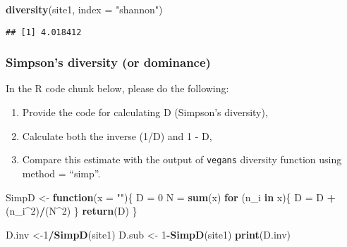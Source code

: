 \documentclass[
]{article}
\newenvironment{Shaded}{\begin{snugshade}}{\end{snugshade}}
\newcommand{\AttributeTok}[1]{\textcolor[rgb]{0.13,0.29,0.53}{#1}}
\newcommand{\ControlFlowTok}[1]{\textcolor[rgb]{0.13,0.29,0.53}{\textbf{#1}}}
\newcommand{\DecValTok}[1]{\textcolor[rgb]{0.00,0.00,0.81}{#1}}
\newcommand{\FunctionTok}[1]{\textcolor[rgb]{0.13,0.29,0.53}{\textbf{#1}}}
\newcommand{\NormalTok}[1]{#1}
\newcommand{\OtherTok}[1]{\textcolor[rgb]{0.56,0.35,0.01}{#1}}
\newcommand{\SpecialCharTok}[1]{\textcolor[rgb]{0.81,0.36,0.00}{\textbf{#1}}}
\newcommand{\StringTok}[1]{\textcolor[rgb]{0.31,0.60,0.02}{#1}}
\begin{document}
\begin{Shaded}
\begin{Highlighting}[]
\FunctionTok{diversity}\NormalTok{(site1, }\AttributeTok{index =} \StringTok{"shannon"}\NormalTok{)}
\end{Highlighting}
\end{Shaded}

\begin{verbatim}
## [1] 4.018412
\end{verbatim}

\subsubsection{Simpson's diversity (or
dominance)}\label{simpsons-diversity-or-dominance}

In the R code chunk below, please do the following:

\begin{enumerate}
\def\labelenumi{\arabic{enumi}.}
\item
  Provide the code for calculating D (Simpson's diversity),
\item
  Calculate both the inverse (1/D) and 1 - D,
\item
  Compare this estimate with the output of
  \texttt{vegan\textquotesingle{}s} diversity function using method =
  ``simp''.
\end{enumerate}

\begin{Shaded}
\begin{Highlighting}[]
\NormalTok{SimpD }\OtherTok{\textless{}{-}} \ControlFlowTok{function}\NormalTok{(}\AttributeTok{x =} \StringTok{""}\NormalTok{)\{}
\NormalTok{  D }\OtherTok{=} \DecValTok{0}
\NormalTok{  N }\OtherTok{=} \FunctionTok{sum}\NormalTok{(x)}
  \ControlFlowTok{for}\NormalTok{ (n\_i }\ControlFlowTok{in}\NormalTok{ x)\{}
\NormalTok{    D }\OtherTok{=}\NormalTok{ D }\SpecialCharTok{+}\NormalTok{ (n\_i}\SpecialCharTok{\^{}}\DecValTok{2}\NormalTok{)}\SpecialCharTok{/}\NormalTok{(N}\SpecialCharTok{\^{}}\DecValTok{2}\NormalTok{)}
\NormalTok{  \}}
  \FunctionTok{return}\NormalTok{(D)}
\NormalTok{\}}

\NormalTok{D.inv }\OtherTok{\textless{}{-}}\DecValTok{1}\SpecialCharTok{/}\FunctionTok{SimpD}\NormalTok{(site1)}
\NormalTok{D.sub }\OtherTok{\textless{}{-}} \DecValTok{1}\SpecialCharTok{{-}}\FunctionTok{SimpD}\NormalTok{(site1)}
\FunctionTok{print}\NormalTok{(D.inv)}
\end{Highlighting}
\end{Shaded}
\end{document}
